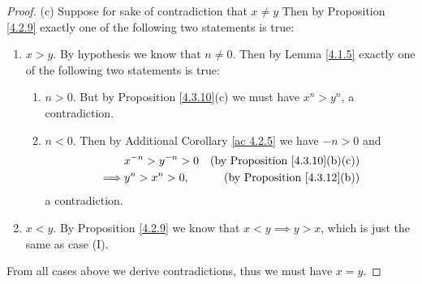 \begin{proof}{(c)}
    Suppose for sake of contradiction that \(x \neq y\)
    Then by Proposition \ref{4.2.9} exactly one of the following two statements is true:
    \begin{enumerate}[label=(\Roman*)]
        \item \(x > y\).
              By hypothesis we know that \(n \neq 0\).
              Then by Lemma \ref{4.1.5} exactly one of the following two statements is true:
              \begin{enumerate}[label=(\roman*)]
                  \item \(n > 0\).
                        But by Proposition \ref{4.3.10}(c) we must have \(x^n > y^n\), a contradiction.
                  \item \(n < 0\).
                        Then by Additional Corollary \ref{ac 4.2.5} we have \(-n > 0\) and
                        \begin{align*}
                                     & x^{-n} > y^{-n} > 0 & \text{(by Proposition \ref{4.3.10}(b)(c))} \\
                            \implies & y^n > x^n > 0,      & \text{(by Proposition \ref{4.3.12}(b))}
                        \end{align*}
                        a contradiction.
              \end{enumerate}
        \item \(x < y\).
              By Proposition \ref{4.2.9} we know that \(x < y \implies y > x\), which is just the same as case (I).
    \end{enumerate}
    From all cases above we derive contradictions, thus we must have \(x = y\).
\end{proof}

